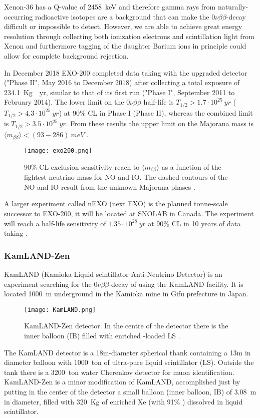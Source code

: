 \documentclass{subnucbo}
\begin{document}
Xenon-36 has a Q-value of \SI{2458}{keV} and therefore gamma rays from naturally-occurring radioactive isotopes are a background that can make the $0\nu\beta\beta$-decay difficult or impossible to detect.
However, we are able to achieve great energy resolution through collecting both ionization electrons and scintillation light from Xenon and furthermore tagging of the daughter Barium ions in principle could allow for complete background rejection.

In December 2018 EXO-200 completed data taking with the upgraded detector ("Phase II", May 2016 to December 2018) after collecting a total exposure of \SI{234.1}{Kg\cdot yr}, similar to that of its first run ("Phase I", September 2011 to February 2014).
The lower limit on the  $0\nu\beta\beta$ half-life is $T_{1/2}>1.7\cdot10^{25}\SI{}{yr}$ ($T_{1/2}>4.3\cdot10^{25}\SI{}{yr}$) at 90\% CL in Phase I (Phase II), whereas the combined limit is $T_{1/2}>3.5\cdot10^{25}\SI{}{yr}$. From these results the upper limit on the Majorana mass is $\langle m_{\beta\beta}\rangle<(93-286)\SI{}{meV}$ \cite{ref:exo}.

\begin{figure}[h]
\centering
\texttt{[image: exo200.png]}
\caption{90\% CL exclusion sensitivity reach to $\langle m_{\beta\beta}\rangle$ as a function of the lightest neutrino mass for NO and IO. The dashed contours of the NO and IO result from the unknown Majorana phases \cite{ref:nexo}.}
\end{figure}

A larger experiment called nEXO (next EXO) is the planned tonne-scale successor to EXO-200, it will be located at SNOLAB in Canada.
The experiment will reach a half-life sensitivity of $1.35\cdot10^{28}\SI{}{yr}$ at 90\% CL in 10 years of data taking \cite{ref:nexo}.

\subsubsection{KamLAND-Zen}
KamLAND (Kamioka Liquid scintillator Anti-Neutrino Detector) is an experiment searching for the $0\nu\beta\beta$-decay of  using the KamLAND facility. It is located \SI{1000}{m} underground in the Kamioka mine in Gifu prefecture in Japan.
\begin{figure}
\centering
\texttt{[image: KamLAND.png]}
\caption{KamLAND-Zen detector. In the centre of the detector there is the inner balloon (IB) filled with enriched -loaded LS \cite{ref:kam}.}
\label{fig:kamDet}
\end{figure}
The KamLAND detector is a 18m-diameter spherical thank containing a 13m in diameter balloon with \SI{1000}{ton} of ultra-pure liquid scintillator (LS). Outside the tank there is a \SI{3200}{ton} water Cherenkov detector for muon identification.
KamLAND-Zen is a minor modification of KamLAND, accomplished just by putting in the center of the detector a small balloon (inner balloon, IB) of \SI{3.08}{m} in diameter, filled with \SI{320}{Kg} of enriched Xe (with 91\% ) dissolved in liquid scintillator.
\end{document}
